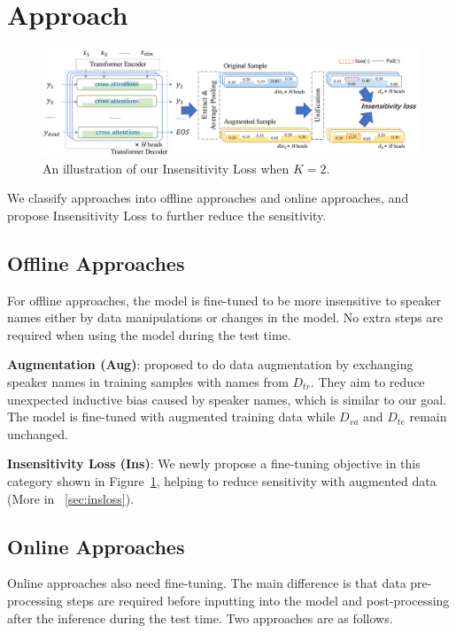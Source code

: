 \section{Approach}
\label{sec:approach}


\begin{figure}[th]
	\centering
	\includegraphics[scale=0.6]{insloss.pdf}
	\caption{An illustration of our Insensitivity Loss when $K=2$.
	}
	\label{fig:insloss}
\end{figure}

We classify approaches into offline approaches and online approaches, and propose Insensitivity Loss to further reduce the sensitivity.
\subsection{Offline Approaches}

For offline approaches, the model is fine-tuned to be more insensitive to speaker names either by data manipulations or changes in the model. No extra steps are required when using the model during the test time.

\textbf{Augmentation (Aug)}: \citet{liu2021controllable} proposed to do data augmentation by exchanging speaker names in training samples with names from $D_{tr}$. They aim to reduce unexpected inductive bias caused by speaker names, which is similar to our goal. The model is fine-tuned with augmented training data while $D_{va}$ and $D_{te}$ remain unchanged.

\textbf{Insensitivity Loss (Ins)}: We newly propose a fine-tuning objective in this category shown in Figure~\ref{fig:insloss}, helping to reduce sensitivity with augmented data (More in ~\ref{sec:insloss}).


\subsection{Online Approaches}
\label{sec:dda}
Online approaches also need fine-tuning. The main difference is that data pre-processing steps are required before inputting into the model and post-processing after the inference during the test time. Two approaches are as follows.

